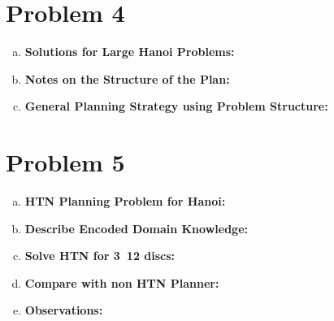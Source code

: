 \documentclass[]{article}
\begin{document}
\section{Problem 4}
	\begin{enumerate}[(a)]
		\item \textbf{Solutions for Large Hanoi Problems:}\\
		\item \textbf{Notes on the Structure of the Plan:}\\
		\item \textbf{General Planning Strategy using Problem Structure:}\\
	\end{enumerate}
	
\section{Problem 5}
	\begin{enumerate}[(a)]
		\item \textbf{HTN Planning Problem for Hanoi:}\\
		\item \textbf{Describe Encoded Domain Knowledge:}\\
		\item \textbf{Solve HTN for 3~12 discs:}\\
		\item \textbf{Compare with non HTN Planner:}\\
		\item \textbf{Observations:}\\
	\end{enumerate}
\end{document}
